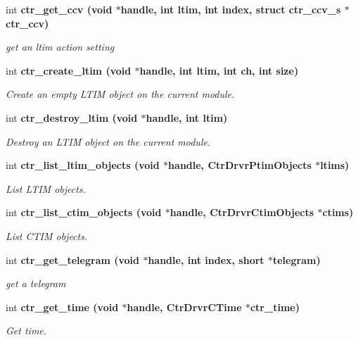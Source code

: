 \begin{CompactItemize}
int \bf{ctr\_\-get\_\-ccv} (void $\ast$handle, int ltim, int index, struct \bf{ctr\_\-ccv\_\-s} $\ast$ctr\_\-ccv)
\begin{CompactList}\small\item\em get an ltim action setting \item\end{CompactList}\item 
int \bf{ctr\_\-create\_\-ltim} (void $\ast$handle, int ltim, int ch, int size)
\begin{CompactList}\small\item\em Create an empty LTIM object on the current module. \item\end{CompactList}\item 
int \bf{ctr\_\-destroy\_\-ltim} (void $\ast$handle, int ltim)
\begin{CompactList}\small\item\em Destroy an LTIM object on the current module. \item\end{CompactList}\item 
int \bf{ctr\_\-list\_\-ltim\_\-objects} (void $\ast$handle, Ctr\-Drvr\-Ptim\-Objects $\ast$ltims)
\begin{CompactList}\small\item\em List LTIM objects. \item\end{CompactList}\item 
int \bf{ctr\_\-list\_\-ctim\_\-objects} (void $\ast$handle, Ctr\-Drvr\-Ctim\-Objects $\ast$ctims)
\begin{CompactList}\small\item\em List CTIM objects. \item\end{CompactList}\item 
int \bf{ctr\_\-get\_\-telegram} (void $\ast$handle, int index, short $\ast$telegram)
\begin{CompactList}\small\item\em get a telegram \item\end{CompactList}\item 
int \bf{ctr\_\-get\_\-time} (void $\ast$handle, Ctr\-Drvr\-CTime $\ast$ctr\_\-time)
\begin{CompactList}\small\item\em Get time. \item\end{CompactList}\item 

\end{CompactItemize}
